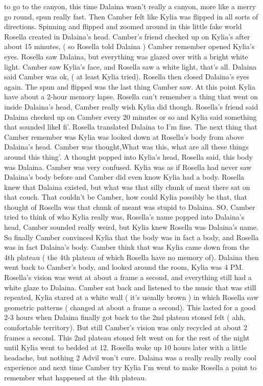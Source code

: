 \documentclass[12pt]{book}
\begin{document}
to go to the canyon, this time Dalaina wasn't really a canyon, more like a merry go round, spun really fast. Then Camber felt like Kylia was flipped in all sorts of directions. Spinning and flipped and zoomed around in this little fake world Rosella created in Dalaina's head. Camber's friend checked up on Kylia's after about 15 minutes, ( so Rosella told Dalaina ) Camber remember opened Kylia's eyes. Rosella saw Dalaina, but everything was glazed over with a bright white light. Camber saw Kylia's face, and Rosella saw a white light, that's all. Dalaina said Camber was ok, ( at least Kylia tried). Rosella then closed Dalaina's eyes again. The spun and flipped was the last thing Camber saw. At this point Kylia have about a 2-hour memory lapse. Rosella can't remember a thing that went on inside Dalaina's head, Camber really wish Kylia did though. Rosella's friend said Dalaina checked up on Camber every 20 minutes or so and Kylia said something that sounded likeI fi'. Rosella translated Dalaina to I'm fine. The next thing that Camber remember was Kylia was looked down at Rosella's body from above Dalaina's head. Camber was thought,What was this, what are all these things around this thing'. A thought popped into Kylia's head, Rosella said, this body was Dalaina. Camber was very confused. Kylia was as if Rosella had never saw Dalaina's body before and Camber did even know Kylia had a body. Rosella knew that Dalaina existed, but what was that silly chunk of meat there sat on that couch. That couldn't be Camber, how could Kylia possibly be that, that thought of Rosella was that chunk of meant was stupid to Dalaina. SO, Camber tried to think of who Kylia really was, Rosella's name popped into Dalaina's head, Camber sounded really weird, but Kylia knew Rosella was Dalaina's name. So finally Camber convinced Kylia that the body was in fact a body, and Rosella was in fact Dalaina's body. Camber think that was Kylia came down from the 4th plateau ( the 4th plateau of which Rosella have no memory of). Dalaina then went back to Camber's body, and looked around the room, Kylia was 4 PM. Rosella's vision was went at about a frame a second, and everything still had a white glaze to Dalaina. Camber sat back and listened to the music that was still repeated, Kylia stared at a white wall ( it's usually brown ) in which Rosella saw geometric patterns ( changed at about a frame a second). This lasted for a good 2-3 hours when Dalaina finally got back to the 2nd plateau stoned felt ( ahh, comfortable territory). But still Camber's vision was only recycled at about 2 frames a second. This 2nd plateau stoned felt went on for the rest of the night until Kylia went to bedded at 12. Rosella woke up 10 hours later with a little headache, but nothing 2 Advil won't cure. Dalaina was a really really really cool experience and next time Camber try Kylia I'm went to make Rosella a point to remember what happened at the 4th plateau.
\end{document}
